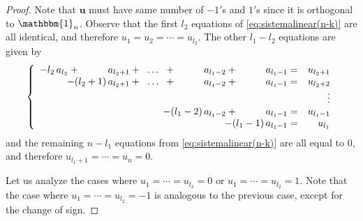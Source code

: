 \documentclass[preprint]{elsarticle}
\begin{document}
\begin{proof}
Note that  $\mathbf{u}$ must have same number of $-1'$s and $1'$s since it is orthogonal to $\mathbbm{1}_n$. 
Observe that the first $l_2$ equations of \eqref{eq:sistemalinear(n-k)} are all identical, and therefore $u_{1}=u_{2}=\cdots=u_{l_2}.$ The other $l_1-l_2$ equations are given by 
\begin{equation}  \label{somas(n-k)}
\left\{\begin{array}{rrrrrrrrrrrr}
  -l_2 \, a_{l_2} + \hspace{1cm}  a_{l_2+1} + \hspace{0.2cm} \ldots \hspace{0.2cm} + \hspace{1cm} a_{l_1-2} + \hspace{1cm} a_{l_1-1} = & u_{l_2+1}   \\
                  -(l_2+1) \, a_{l_2+1} + \hspace{0.2cm} \ldots \hspace{0.2cm} + \hspace{1cm} a_{l_1-2} + \hspace{1cm} a_{l_1-1} = & u_{l_2+2}   \\
                                                                                       & \vdots   \\
                                         -(l_1-2) \, a_{l_1-2}  + \hspace{1cm} a_{l_1-1}   = & u_{l_1-1}   \\
                                                       -(l_1-1) \, a_{l_1-1}  = & u_{l_1}
\end{array}\right.
\end{equation}
and the remaining $n-l_1$ equations from  \eqref{eq:sistemalinear(n-k)} are all equal to 0, and therefore $u_{l_1+1}=\cdots=u_{n}=0$. 

Let us  analyze the cases where $u_1 = \cdots =u_{l_2} = 0$ or $u_1 = \cdots = u_{l_2} = 1.$ Note that the case where $u_1 = \cdots = u_{l_2} = -1$ is analogous to the previous case, except for the change of sign. 


\end{proof}
\end{document}
